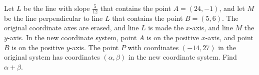 Let $L$ be the line with slope $\tfrac{5}{12}$ that contains the point $A=(24,-1)$, and let $M$ be the line perpendicular to line $L$ that contains the point $B=(5,6)$. The original coordinate axes are erased, and line $L$ is made the $x$-axis, and line $M$ the $y$-axis. In the new coordinate system, point $A$ is on the positive $x$-axis, and point $B$ is on the positive $y$-axis. The point $P$ with coordinates $(-14,27)$ in the original system has coordinates $(\alpha,\beta)$ in the new coordinate system. Find $\alpha+\beta$.